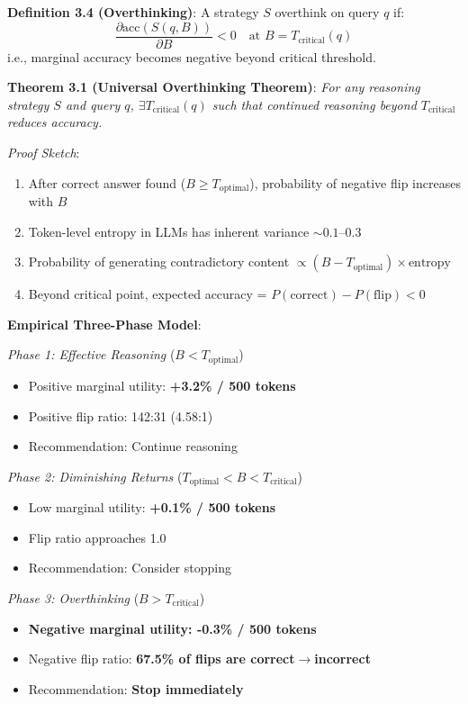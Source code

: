 \documentclass[10pt,preprint]{neurips_2024}
\begin{document}
\textbf{Definition 3.4 (Overthinking)}: A strategy $S$ overthink on query $q$ if:
$$\frac{\partial \text{acc}(S(q, B))}{\partial B} < 0 \quad \text{at } B = T_{\text{critical}}(q)$$
i.e., marginal accuracy becomes negative beyond critical threshold.

\textbf{Theorem 3.1 (Universal Overthinking Theorem)}: \textit{For any reasoning strategy $S$ and query $q$, $\exists T_{\text{critical}}(q)$ such that continued reasoning beyond $T_{\text{critical}}$ reduces accuracy.}

\textit{Proof Sketch}:
\begin{enumerate}
    \item After correct answer found ($B \geq T_{\text{optimal}}$), probability of negative flip increases with $B$
    \item Token-level entropy in LLMs has inherent variance $\sim 0.1$--$0.3$
    \item Probability of generating contradictory content $\propto (B - T_{\text{optimal}}) \times \text{entropy}$
    \item Beyond critical point, expected accuracy = $P(\text{correct}) - P(\text{flip}) < 0$
\end{enumerate}

\textbf{Empirical Three-Phase Model}:

\textit{Phase 1: Effective Reasoning} ($B < T_{\text{optimal}}$)
\begin{itemize}
    \item Positive marginal utility: \textbf{+3.2\% / 500 tokens}
    \item Positive flip ratio: 142:31 (4.58:1)
    \item Recommendation: Continue reasoning
\end{itemize}

\textit{Phase 2: Diminishing Returns} ($T_{\text{optimal}} < B < T_{\text{critical}}$)
\begin{itemize}
    \item Low marginal utility: \textbf{+0.1\% / 500 tokens}
    \item Flip ratio approaches 1.0
    \item Recommendation: Consider stopping
\end{itemize}

\textit{Phase 3: Overthinking} ($B > T_{\text{critical}}$)
\begin{itemize}
    \item \textbf{Negative marginal utility: -0.3\% / 500 tokens}
    \item Negative flip ratio: \textbf{67.5\% of flips are correct$\rightarrow$incorrect}
    \item Recommendation: \textbf{Stop immediately}
\end{itemize}
\end{document}
